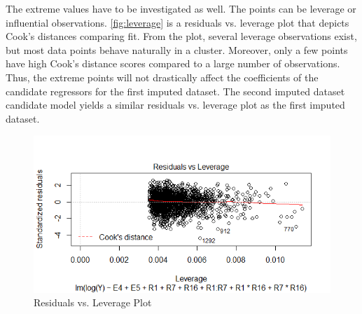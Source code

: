 \documentclass[11pt]{article}
\begin{document}
The extreme values have to be investigated as well. The points can be leverage or influential observations. \autoref{fig:leverage} is a residuals vs. leverage plot that depicts Cook's distances comparing fit. From the plot, several leverage observations exist, but most data points behave naturally in a cluster. Moreover, only a few points have high Cook’s distance scores compared to a large number of observations. Thus, the extreme points will not drastically affect the coefficients of the candidate regressors for the first imputed dataset. The second imputed dataset candidate model yields a similar residuals vs. leverage plot as the first imputed dataset. 

\begin{figure}[h!]
\begin{center}
\includegraphics[scale=0.69]{leverage}
\end{center}
\caption{Residuals vs. Leverage Plot}
\label{fig:leverage}
\end{figure}
\end{document}
